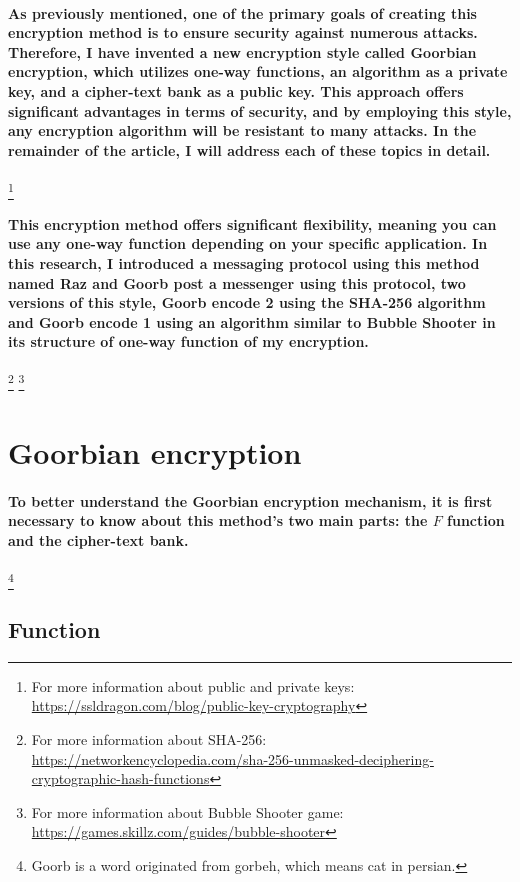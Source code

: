 \documentclass[oneside]{book}
\newcommand{\myparagraph}[1]{\paragraph{\textnormal{#1}}}
\begin{document}
\myparagraph{
As previously mentioned, one of the primary goals of creating this encryption method is to ensure security against numerous attacks. Therefore, I have invented a new encryption style called \textbf{Goorbian encryption}, which utilizes one-way functions, an algorithm as a private key, and a cipher-text bank as a public key. This approach offers significant advantages in terms of security, and by employing this style, any encryption algorithm will be resistant to many attacks. In the remainder of the article, I will address each of these topics in detail.
}
\footnote{For more information about public and private keys:\\ \href{https://ssldragon.com/blog/public-key-cryptography}{https://ssldragon.com/blog/public-key-cryptography}}

\myparagraph{
This encryption method offers significant flexibility, meaning you can use any one-way function depending on your specific application. In this research, I introduced a messaging protocol using this method named \textbf{Raz} and \textbf{Goorb post} a messenger using this protocol, two versions of this style, \textbf{Goorb encode 2} using the SHA-256 algorithm and \textbf{Goorb encode 1} using an algorithm similar to Bubble Shooter in its structure of one-way function of my encryption.
}
\footnote{For more information about SHA-256:\\ \href{https://networkencyclopedia.com/sha-256-unmasked-deciphering-cryptographic-hash-functions}{https://networkencyclopedia.com/sha-256-unmasked-deciphering-cryptographic-hash-functions}}
\footnote{For more information about Bubble Shooter game:\\ \href{https://games.skillz.com/guides/bubble-shooter}{https://games.skillz.com/guides/bubble-shooter}}

\section{Goorbian encryption}

\myparagraph{
To better understand the \textbf{Goorbian encryption} mechanism, it is first necessary to know about this method's two main parts: the $F$ function and the cipher-text bank.
}
\footnote{Goorb is a word originated from gorbeh, which means cat in persian.}

\subsection{Function}
\end{document}
